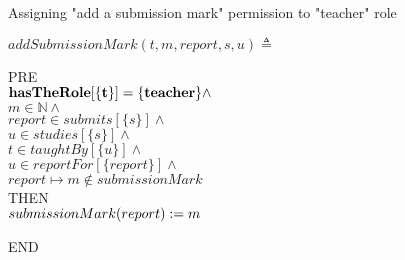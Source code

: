  \begin{algorithm}                      %
 	\caption{Assigning "add a submission mark" permission to "teacher" role}         %
 	\label{alg2}                        
 	\vspace{0.5cm} 
 	$addSubmissionMark(t, m, report, s, u) \triangleq$
 	
 	PRE \\
 	
 	\quad ${\bf hasTheRole[\{t\}] = \{teacher\}} \wedge$\\
 	
 	\quad $m \in \mathbb{N} \wedge$ \\
 	
 	\quad $report \in submits [\{s\}] \wedge$ \\
 	
 	\quad $u \in studies [\{s\}]\wedge$ \\
 	
 	\quad $t \in taughtBy [\{u\}] \wedge$ \\
 	
 \quad $u \in reportFor [\{report\}]\wedge$ \\
 
 \quad $report \mapsto m \notin submissionMark $ \\
 	
 	THEN \\ 
 	
 	\quad $ submissionMark(report):= m \\$
 	

 	
 	END
 \end{algorithm} 
